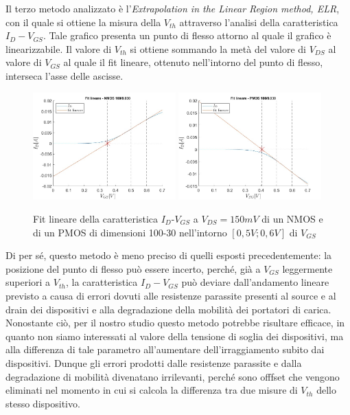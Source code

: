 \documentclass[12pt, letterpaper]{book}
\begin{document}
Il terzo metodo analizzato è l'\emph{Extrapolation in the Linear Region method, ELR}, con il quale si ottiene la misura della $V_{th}$ attraverso l'analisi della caratteristica $I_D-V_{GS}$.  Tale grafico presenta un punto di flesso attorno al quale il grafico è linearizzabile. Il valore di $V_{th}$ si ottiene sommando la metà del valore di $V_{DS}$ al valore di $V_{GS}$ al quale il fit lineare, ottenuto nell'intorno del punto di flesso, interseca l'asse delle ascisse.\\


\begin{figure}[h!]
  \centering
  \includegraphics[width=0.49\textwidth]{LinearFit-N4-100-30}
  \includegraphics[width=0.49\textwidth]{LinearFit-P1-100-30}
  \caption{Fit lineare della caratteristica  $I_D$-$V_{GS}$ a $V_{DS}=150mV$ di un NMOS e di un PMOS di dimensioni 100-30 nell'intorno $[0,5V ; 0,6V]$ di $V_{GS}$}
\end{figure}

Di per sé, questo metodo è meno preciso di quelli esposti precedentemente: la posizione del punto di flesso può essere incerto, perché, già a $V_{GS}$ leggermente superiori a $V_{th}$, la caratteristica $I_D-V_{GS}$ può deviare dall'andamento lineare previsto a causa di errori dovuti alle resistenze parassite presenti al source e al drain dei dispositivi e alla degradazione della mobilità dei portatori di carica.
Nonostante ciò, per il nostro studio questo metodo potrebbe risultare efficace, in quanto non siamo interessati al valore della tensione di soglia dei dispositivi, ma alla differenza di tale parametro all'aumentare dell'irraggiamento subito dai dispositivi. Dunque gli errori prodotti dalle resistenze parassite e dalla degradazione di mobilità divenatano irrilevanti, perché sono offfset che vengono eliminati nel momento in cui si calcola la differenza tra due misure di $V_{th}$ dello stesso dispositivo.
\end{document}
